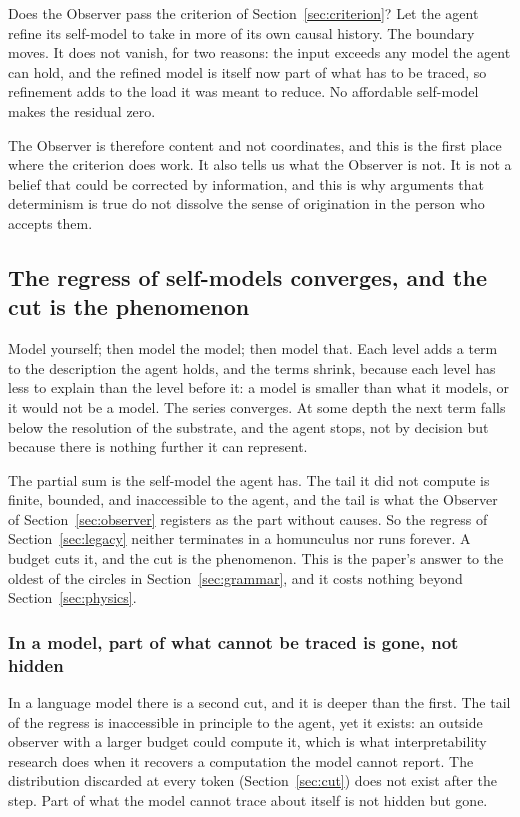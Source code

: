 Does the Observer pass the criterion of Section~\ref{sec:criterion}? Let the agent refine its self-model
to take in more of its own causal history. The boundary moves. It does not vanish, for two reasons: the
input exceeds any model the agent can hold, and the refined model is itself now part of what has to be
traced, so refinement adds to the load it was meant to reduce. No affordable self-model makes the
residual zero.

The Observer is therefore content and not coordinates, and this is the first place where the criterion
does work. It also tells us what the Observer is not. It is not a belief that
could be corrected by information, and this is why arguments that determinism is true do not dissolve
the sense of origination in the person who accepts them.

\subsection{The regress of self-models converges, and the cut is the phenomenon}
\label{sec:regress}

Model yourself; then model the model; then model that. Each level adds a term to the description the
agent holds, and the terms shrink, because each level has less to explain than the level before it: a
model is smaller than what it models, or it would not be a model. The series converges. At some depth
the next term falls below the resolution of the substrate, and the agent stops, not by decision but
because there is nothing further it can represent.

The partial sum is the self-model the agent has. The tail it did not compute is finite, bounded, and
inaccessible to the agent, and the tail is what the Observer of Section~\ref{sec:observer} registers as
the part without causes. So the regress of Section~\ref{sec:legacy} neither terminates in a homunculus nor runs forever. A
budget cuts it, and the cut is the phenomenon. This is the paper's answer to the oldest of the circles in Section~\ref{sec:grammar}, and it costs nothing beyond Section~\ref{sec:physics}.

\subsubsection{In a model, part of what cannot be traced is gone, not hidden}
\label{sec:secondcut}

In a language model there is a second cut, and it is deeper than the first. The tail of the regress is
inaccessible in principle to the agent, yet it exists: an outside observer with a larger budget could
compute it, which is what interpretability research does when it recovers a computation the model cannot
report. The distribution discarded at every token (Section~\ref{sec:cut}) does not exist after the step.
Part of what the model cannot trace about itself is not hidden but gone.

